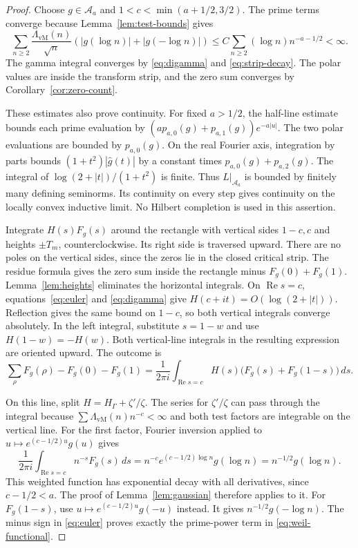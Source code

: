 \documentclass[11pt]{article}
\theoremstyle{definition}
\theoremstyle{remark}
\numberwithin{equation}{section}
\newcommand{\A}{\mathcal A}
\begin{document}
\begin{proof}
Choose $g\in\A_a$ and $1<c<\min(a+1/2,3/2)$.
The prime terms converge because Lemma~\ref{lem:test-bounds} gives
\[
 \sum_{n\geq2}\frac{\Lambda_{\mathrm{vM}}(n)}{\sqrt n}
                    (|g(\log n)|+|g(-\log n)|)
 \leq C\sum_{n\geq2}(\log n)n^{-a-1/2}<\infty.
\]
The gamma integral converges by \eqref{eq:digamma} and
\eqref{eq:strip-decay}.  The polar values are inside the transform strip,
and the zero sum converges by Corollary~\ref{cor:zero-count}.

These estimates also prove continuity.  For fixed $a>1/2$, the
half-line estimate bounds each prime evaluation by
$(a p_{a,0}(g)+p_{a,1}(g))e^{-a|u|}$.
The two polar evaluations are bounded by $p_{a,0}(g)$.
On the real Fourier axis, integration by parts bounds
$(1+t^2)|\widehat g(t)|$ by a constant times
$p_{a,0}(g)+p_{a,2}(g)$.
The integral of $\log(2+|t|)/(1+t^2)$ is finite.
Thus $L|_{\A_a}$ is bounded by finitely many defining seminorms.
Its continuity on every step gives continuity on the locally convex
inductive limit.  No Hilbert completion is used in this assertion.


Integrate $H(s)F_g(s)$ around the rectangle with vertical sides $1-c,c$
and heights $\pm T_m$, counterclockwise.  Its right side is traversed upward.
There are no poles on the vertical sides, since the zeros lie in the
closed critical strip.
The residue formula gives the zero sum inside the rectangle minus
$F_g(0)+F_g(1)$.
Lemma~\ref{lem:heights} eliminates the horizontal integrals.
On $\operatorname{Re}s=c$, equations~\eqref{eq:euler} and
\eqref{eq:digamma} give $H(c+it)=O(\log(2+|t|))$.
Reflection gives the same bound on $1-c$, so both vertical integrals
converge absolutely.
In the left integral, substitute $s=1-w$ and use $H(1-w)=-H(w)$.
Both vertical-line integrals in the resulting expression are oriented upward.
The outcome is
\begin{equation}
 \sum_\rho F_g(\rho)-F_g(0)-F_g(1)
 =\frac1{2\pi i}\int_{\operatorname{Re}s=c}
           H(s)\bigl(F_g(s)+F_g(1-s)\bigr)\,ds.
 \label{eq:spine-contour}
\end{equation}

On this line, split $H=H_\Gamma+\zeta'/\zeta$.
The series for $\zeta'/\zeta$ can pass through the integral because
$\sum\Lambda_{\mathrm{vM}}(n)n^{-c}<\infty$ and both test factors are integrable
on the vertical line.
For the first factor, Fourier inversion applied to
$u\mapsto e^{(c-1/2)u}g(u)$ gives
\begin{equation}
 \frac1{2\pi i}\int_{\operatorname{Re}s=c}n^{-s}F_g(s)\,ds
 =n^{-c}e^{(c-1/2)\log n}g(\log n)
 =n^{-1/2}g(\log n).
 \label{eq:prime-inversion}
\end{equation}
This weighted function has exponential decay with all derivatives, since
$c-1/2<a$.  The proof of Lemma~\ref{lem:gaussian} therefore applies to it.
For $F_g(1-s)$, use $u\mapsto e^{(c-1/2)u}g(-u)$ instead.
It gives $n^{-1/2}g(-\log n)$.
The minus sign in \eqref{eq:euler} proves exactly the prime-power term in
\eqref{eq:weil-functional}.


\end{proof}
\end{document}
